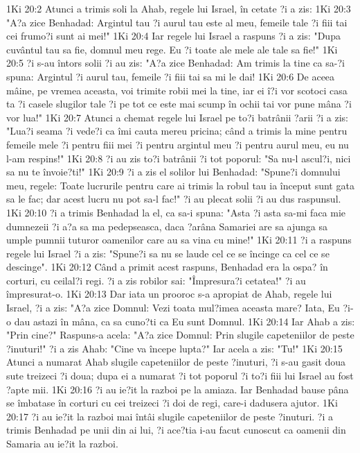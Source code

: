 1Ki 20:2  Atunci a trimis soli la Ahab, regele lui Israel, în cetate ?i a zis:
1Ki 20:3  "A?a zice Benhadad: Argintul tau ?i aurul tau este al meu, femeile tale ?i fiii tai cei frumo?i sunt ai mei!"
1Ki 20:4  Iar regele lui Israel a raspuns ?i a zis: "Dupa cuvântul tau sa fie, domnul meu rege. Eu ?i toate ale mele ale tale sa fie!"
1Ki 20:5  ?i s-au întors solii ?i au zis: "A?a zice Benhadad: Am trimis la tine ca sa-?i spuna: Argintul ?i aurul tau, femeile ?i fiii tai sa mi le dai!
1Ki 20:6  De aceea mâine, pe vremea aceasta, voi trimite robii mei la tine, iar ei î?i vor scotoci casa ta ?i casele slugilor tale ?i pe tot ce este mai scump în ochii tai vor pune mâna ?i vor lua!"
1Ki 20:7  Atunci a chemat regele lui Israel pe to?i batrânii ?arii ?i a zis: "Lua?i seama ?i vede?i ca îmi cauta mereu pricina; când a trimis la mine pentru femeile mele ?i pentru fiii mei ?i pentru argintul meu ?i pentru aurul meu, eu nu l-am respins!"
1Ki 20:8  ?i au zis to?i batrânii ?i tot poporul: "Sa nu-l ascul?i, nici sa nu te învoie?ti!"
1Ki 20:9  ?i a zis el solilor lui Benhadad: "Spune?i domnului meu, regele: Toate lucrurile pentru care ai trimis la robul tau ia început sunt gata sa le fac; dar acest lucru nu pot sa-l fac!" ?i au plecat solii ?i au dus raspunsul.
1Ki 20:10  ?i a trimis Benhadad la el, ca sa-i spuna: "Asta ?i asta sa-mi faca mie dumnezeii ?i a?a sa ma pedepseasca, daca ?arâna Samariei are sa ajunga sa umple pumnii tuturor oamenilor care au sa vina cu mine!"
1Ki 20:11  ?i a raspuns regele lui Israel ?i a zis: "Spune?i sa nu se laude cel ce se încinge ca cel ce se descinge".
1Ki 20:12  Când a primit acest raspuns, Benhadad era la ospa? în corturi, cu ceilal?i regi. ?i a zis robilor sai: "Împresura?i cetatea!" ?i au împresurat-o.
1Ki 20:13  Dar iata un prooroc s-a apropiat de Ahab, regele lui Israel, ?i a zis: "A?a zice Domnul: Vezi toata mul?imea aceasta mare? Iata, Eu ?i-o dau astazi în mâna, ca sa cuno?ti ca Eu sunt Domnul.
1Ki 20:14  Iar Ahab a zis: "Prin cine?" Raspuns-a acela: "A?a zice Domnul: Prin slugile capeteniilor de peste ?inuturi!" ?i a zis Ahab: "Cine va începe lupta?" Iar acela a zis: "Tu!"
1Ki 20:15  Atunci a numarat Ahab slugile capeteniilor de peste ?inuturi, ?i s-au gasit doua sute treizeci ?i doua; dupa ei a numarat ?i tot poporul ?i to?i fiii lui Israel au fost ?apte mii.
1Ki 20:16  ?i au ie?it la razboi pe la amiaza. Iar Benhadad bause pâna se îmbatase în corturi cu cei treizeci ?i doi de regi, care-i dadusera ajutor.
1Ki 20:17  ?i au ie?it la razboi mai întâi slugile capeteniilor de peste ?inuturi. ?i a trimis Benhadad pe unii din ai lui, ?i ace?tia i-au facut cunoscut ca oamenii din Samaria au ie?it la razboi.
